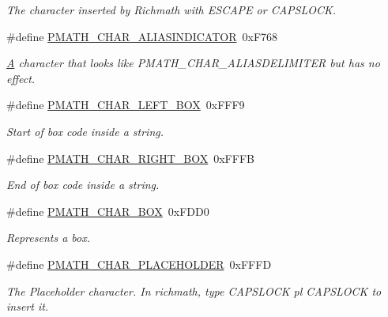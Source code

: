 \begin{CompactItemize}
\begin{CompactList}\small\item\em The character inserted by Richmath with ESCAPE or CAPSLOCK. \item\end{CompactList}\item 
\hypertarget{group__parser_ga9a5a4bbece31aec4a25b94617ffd2e4}{
\#define \hyperlink{group__parser_ga9a5a4bbece31aec4a25b94617ffd2e4}{PMATH\_\-CHAR\_\-ALIASINDICATOR}~0xF768}
\label{group__parser_ga9a5a4bbece31aec4a25b94617ffd2e4}

\begin{CompactList}\small\item\em \hyperlink{class_a}{A} character that looks like PMATH\_\-CHAR\_\-ALIASDELIMITER but has no effect. \item\end{CompactList}\item 
\hypertarget{group__parser_g50754cd7c2add678bdf9c38fbf718876}{
\#define \hyperlink{group__parser_g50754cd7c2add678bdf9c38fbf718876}{PMATH\_\-CHAR\_\-LEFT\_\-BOX}~0xFFF9}
\label{group__parser_g50754cd7c2add678bdf9c38fbf718876}

\begin{CompactList}\small\item\em Start of box code inside a string. \item\end{CompactList}\item 
\hypertarget{group__parser_gbe190a67cf1ce921b90525f37447dee5}{
\#define \hyperlink{group__parser_gbe190a67cf1ce921b90525f37447dee5}{PMATH\_\-CHAR\_\-RIGHT\_\-BOX}~0xFFFB}
\label{group__parser_gbe190a67cf1ce921b90525f37447dee5}

\begin{CompactList}\small\item\em End of box code inside a string. \item\end{CompactList}\item 
\hypertarget{group__parser_g0898bea51a58cb7ea2b06f17712e08f6}{
\#define \hyperlink{group__parser_g0898bea51a58cb7ea2b06f17712e08f6}{PMATH\_\-CHAR\_\-BOX}~0xFDD0}
\label{group__parser_g0898bea51a58cb7ea2b06f17712e08f6}

\begin{CompactList}\small\item\em Represents a box. \item\end{CompactList}\item 
\hypertarget{group__parser_g53235db72e40994196d096cce0569a55}{
\#define \hyperlink{group__parser_g53235db72e40994196d096cce0569a55}{PMATH\_\-CHAR\_\-PLACEHOLDER}~0xFFFD}
\label{group__parser_g53235db72e40994196d096cce0569a55}

\begin{CompactList}\small\item\em The Placeholder character. In richmath, type CAPSLOCK pl CAPSLOCK to insert it. \item\end{CompactList}\end{CompactItemize}
